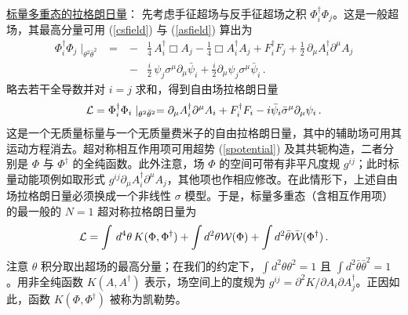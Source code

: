 \noindent\underline{标量多重态的拉格朗日量}：
\noindent 先考虑手征超场与反手征超场之积
$\Phi_i^\dagger\Phi_j$。这是一般超场，其最高分量可用
(\ref{csfield}) 与 (\ref{asfield}) 算出为
\begin{eqnarray}
\Phi^\dagger_i\Phi_j\mid_{\theta^{2}\bar{\theta}^{2}}\,\,\,=
&-&\frac{1}{4}\,A^\dagger_i\Box A_j -\frac{1}{4}\Box A^\dagger_i 
A_j+F^\dagger_i F_j +\frac{1}{2}\,\partial_\mu A^\dagger_i\partial^\mu
A_j \nonumber\\
&-& \frac{i}{2}\,\psi_j\sigma^\mu \partial_\mu \bar{\psi}_{i} +
\frac{i}{2} \partial_\mu \psi_j \sigma^\mu\bar{\psi}_i\,.\nonumber
\end{eqnarray}
略去若干全导数并对 $i=j$ 求和，得到自由场拉格朗日量
$$
{\cal L}=
\Phi^\dagger_i \Phi_i \mid_{\theta^2\bar\theta^2}
=\partial_\mu A^\dagger_i \partial^\mu A_i + F^\dagger_i F_i -i
\bar{\psi}_i \bar{\sigma}^\mu \partial_\mu \psi_i\,.
$$
这是一个无质量标量与一个无质量费米子的自由拉格朗日量，其中的辅助场可用其运动方程消去。超对称相互作用项可用超势 (\ref{spotential}) 及其共轭构造，二者分别是 $\Phi$ 与 $\Phi^\dagger$ 的全纯函数。此外注意，场 $\Phi$ 的空间可带有非平凡度规 $g^{ij}$；此时标量动能项例如取形式 $g^{ij}\partial_\mu
A_i^\dagger \partial^\mu A_j$，其他项也作相应修改。在此情形下，上述自由场拉格朗日量必须换成一个非线性
$\sigma$ 模型。于是，标量多重态（含相互作用项）的最一般的 $N=1$ 超对称拉格朗日量为
$$
{\cal L}=\int\,d^{4}\theta\,K(\Phi,\Phi^\dagger) +
\int d^{2} \theta {\cal W}(\Phi) + \int d^{2} \bar{\theta} 
\bar{\cal W}(\Phi^\dagger)\,.
$$
注意 $\theta$ 积分取出超场的最高分量；在我们的约定下，$\int d^2 \theta \theta^2=1$ 且
$\int d^2 \bar\theta \bar\theta^2=1$。用非全纯函数 $K(A, A^\dagger)$ 表示，场空间上的度规为
$g^{ij}=\partial^2K/\partial A_i\partial A^\dagger_j$。正因如此，函数 $K(\Phi,\Phi^\dagger)$ 被称为凯勒势。



